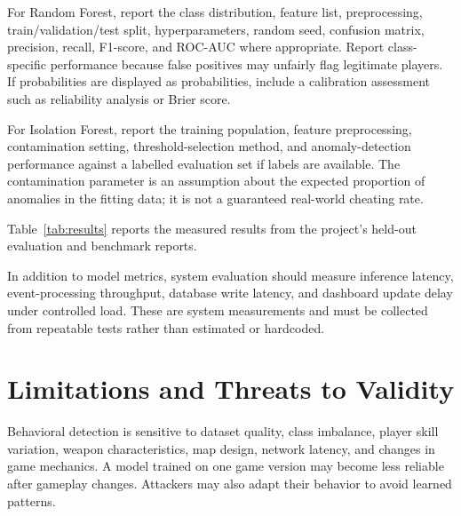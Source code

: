\documentclass[conference]{IEEEtran}
\begin{document}
For Random Forest, report the class distribution, feature list, preprocessing, train/validation/test split, hyperparameters, random seed, confusion matrix, precision, recall, F1-score, and ROC-AUC where appropriate. Report class-specific performance because false positives may unfairly flag legitimate players. If probabilities are displayed as probabilities, include a calibration assessment such as reliability analysis or Brier score.

For Isolation Forest, report the training population, feature preprocessing, contamination setting, threshold-selection method, and anomaly-detection performance against a labelled evaluation set if labels are available. The contamination parameter is an assumption about the expected proportion of anomalies in the fitting data; it is not a guaranteed real-world cheating rate.

Table~\ref{tab:results} reports the measured results from the project's held-out evaluation and benchmark reports.

\begin{table}[t]
\caption{Measured SecureFPS Model Evaluation Results}
\label{tab:results}
\centering
\scriptsize
\setlength{\tabcolsep}{3pt}
\end{table}

In addition to model metrics, system evaluation should measure inference latency, event-processing throughput, database write latency, and dashboard update delay under controlled load. These are system measurements and must be collected from repeatable tests rather than estimated or hardcoded.

\section{Limitations and Threats to Validity}
Behavioral detection is sensitive to dataset quality, class imbalance, player skill variation, weapon characteristics, map design, network latency, and changes in game mechanics. A model trained on one game version may become less reliable after gameplay changes. Attackers may also adapt their behavior to avoid learned patterns.
\end{document}
